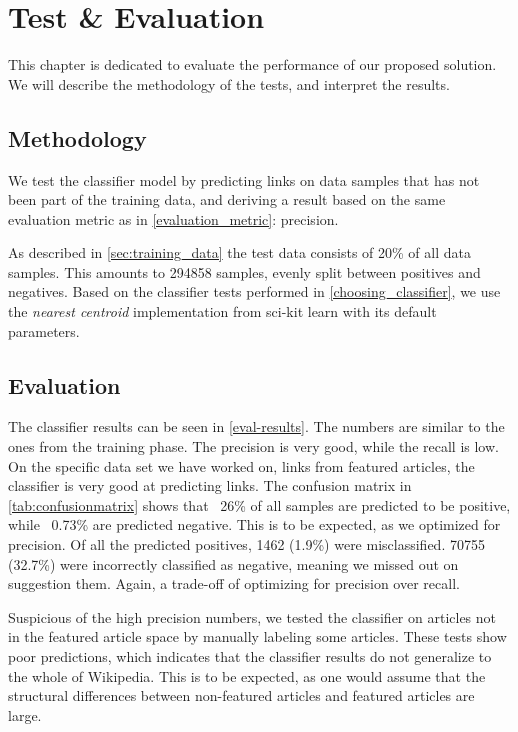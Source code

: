 \chapter{Test \& Evaluation}\label{chap:testeval}
This chapter is dedicated to evaluate the performance of our proposed solution. We will describe the methodology of the tests, and interpret the results.

\section{Methodology}
We test the classifier model by predicting links on data samples that has not been part of the training data, and deriving a result based on the same evaluation metric as in \cref{evaluation_metric}: precision.

As described in \cref{sec:training_data} the test data consists of 20\% of all data samples. This amounts to \num{294858} samples, evenly split between positives and negatives. Based on the classifier tests performed in \cref{choosing_classifier}, we use the \emph{nearest centroid} implementation from sci-kit learn with its default parameters.

\section{Evaluation}
The classifier results can be seen in \cref{eval-results}. The numbers are similar to the ones from the training phase. The precision is very good, while the recall is low. On the specific data set we have worked on, links from featured articles, the classifier is very good at predicting links. The confusion matrix in \cref{tab:confusionmatrix} shows that ~26\% of all samples are predicted to be positive, while ~0.73\% are predicted negative. This is to be expected, as we optimized for precision. Of all the predicted positives, 1462 (1.9\%) were misclassified. \num{70755} (32.7\%) were incorrectly classified as negative, meaning we missed out on suggestion them. Again, a trade-off of optimizing for precision over recall.

Suspicious of the high precision numbers, we tested the classifier on articles not in the featured article space by manually labeling some articles. These tests show poor predictions, which indicates that the classifier results do not generalize to the whole of Wikipedia. This is to be expected, as one would assume that the structural differences between non-featured articles and featured articles are large.

